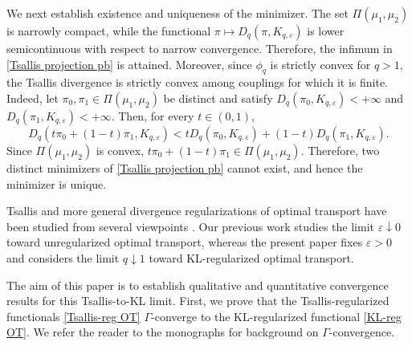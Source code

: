 \documentclass[a4paper,11pt]{article}
\theoremstyle{plain}
\theoremstyle{definition}
\theoremstyle{remark}
\theoremstyle{plain}
\numberwithin{equation}{section}
\newcommand{\ep}{\varepsilon}
\newcommand{\1}{\mbox{1}\hspace{-0.25em}\mbox{l}} %
\begin{document}
We next establish existence and uniqueness of the minimizer. The set $\Pi(\mu_1,\mu_2)$ is narrowly compact, while the functional $\pi\longmapsto D_q(\pi,K_{q,\ep})$ is lower semicontinuous with respect to narrow convergence. Therefore, the infimum in \eqref{Tsallis projection pb} is attained. Moreover, since $\phi_q$ is strictly convex for $q>1$, the Tsallis divergence is strictly convex among couplings for which it is finite. Indeed, let $\pi_0,\pi_1\in\Pi(\mu_1,\mu_2)$ be distinct and satisfy $D_q(\pi_0,K_{q,\ep})<+\infty$ and $D_q(\pi_1,K_{q,\ep})<+\infty$. Then, for every $t\in(0,1)$,
\begin{equation*}
D_q\left(t\pi_0+(1-t)\pi_1,K_{q,\ep}\right) < tD_q(\pi_0,K_{q,\ep}) + (1-t)D_q(\pi_1,K_{q,\ep}).
\end{equation*}
Since $\Pi(\mu_1,\mu_2)$ is convex, $t\pi_0+(1-t)\pi_1 \in \Pi(\mu_1,\mu_2)$.
Therefore, two distinct minimizers of \eqref{Tsallis projection pb} cannot exist, and hence the minimizer is unique.

Tsallis and more general divergence regularizations of optimal transport have been studied from several viewpoints \cite{Bao2022, muzellec2017, terjek2022optimal}. Our previous work \cite{suguro2023convergence} studies the limit $\ep\downarrow0$ toward unregularized optimal transport, whereas the present paper fixes $\ep > 0$ and considers the limit $q \downarrow 1$ toward KL-regularized optimal transport. 

The aim of this paper is to establish qualitative and quantitative convergence results for this Tsallis-to-KL limit. First, we prove that the Tsallis-regularized functionals \eqref{Tsallis-reg OT} $\Gamma$-converge to the KL-regularized functional \eqref{KL-reg OT}. We refer the reader to the monographs \cite{braides2002gamma,dal2012introduction} for background on $\Gamma$-convergence.
\end{document}
